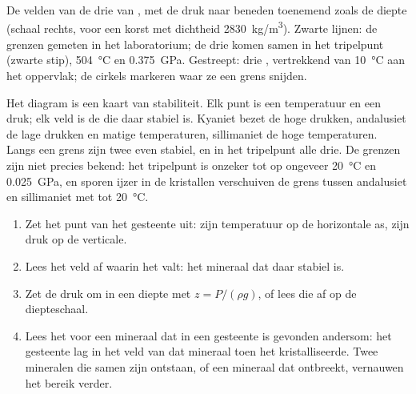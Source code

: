\begin{omfigure}
{\small De velden van de drie  van , met de druk
naar beneden toenemend zoals de diepte (schaal rechts, voor een korst met dichtheid
\qty{2830}{kg/m^3}). Zwarte lijnen: de grenzen gemeten in het laboratorium;
de drie komen samen in het tripelpunt (zwarte stip), \qty{504}{\celsius} en
\qty{0.375}{GPa}. Gestreept: drie , vertrekkend van \qty{10}{\celsius}
aan het oppervlak; de cirkels markeren waar ze een grens snijden.}
\end{omfigure}

Het diagram is een kaart van stabiliteit. Elk punt is een temperatuur en een
druk; elk veld is de  die daar stabiel is. Kyaniet bezet
de hoge drukken, andalusiet de lage drukken en matige temperaturen,
sillimaniet de hoge temperaturen. Langs een grens zijn twee 
even stabiel, en in het tripelpunt alle drie. De grenzen zijn niet
precies bekend: het tripelpunt is onzeker tot op ongeveer \qty{20}{\celsius} en
\qty{0.025}{GPa}, en sporen ijzer in de kristallen verschuiven de
grens tussen andalusiet en sillimaniet met tot \qty{20}{\celsius}.

\begin{method}\label{met:g12:metamorphic-rocks:pt}
\begin{enumerate}
  \item Zet het punt van het gesteente uit: zijn temperatuur op de horizontale
        as, zijn druk op de verticale.
  \item Lees het veld af waarin het valt: het mineraal dat daar stabiel is.
  \item Zet de druk om in een diepte met $z = P/(\rho g)$, of lees die af op
        de diepteschaal.
  \item Lees het voor een mineraal dat in een gesteente is gevonden andersom: het gesteente lag in
        het veld van dat mineraal toen het kristalliseerde. Twee mineralen die samen
        zijn ontstaan, of een mineraal dat ontbreekt, vernauwen het bereik verder.
\end{enumerate}
\end{method}

